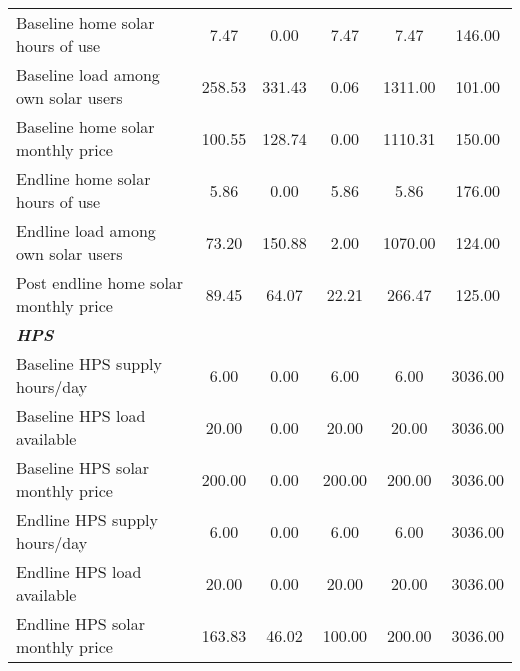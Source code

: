 \begin{table}[htbp]
\begin{tabular}{l*{1}{ccccc}}
Baseline home solar hours of use&        7.47&        0.00&        7.47&        7.47&      146.00\\
Baseline load among own solar users&      258.53&      331.43&        0.06&     1311.00&      101.00\\
Baseline home solar monthly price&      100.55&      128.74&        0.00&     1110.31&      150.00\\
Endline home solar hours of use&        5.86&        0.00&        5.86&        5.86&      176.00\\
Endline load among own solar users&       73.20&      150.88&        2.00&     1070.00&      124.00\\
Post endline home solar monthly price&       89.45&       64.07&       22.21&      266.47&      125.00\\
\textbf{\emph{HPS}} &            &            &            &            &            \\
Baseline HPS supply hours/day&        6.00&        0.00&        6.00&        6.00&     3036.00\\
Baseline HPS load available&       20.00&        0.00&       20.00&       20.00&     3036.00\\
Baseline HPS solar monthly price&      200.00&        0.00&      200.00&      200.00&     3036.00\\
Endline HPS supply hours/day&        6.00&        0.00&        6.00&        6.00&     3036.00\\
Endline HPS load available&       20.00&        0.00&       20.00&       20.00&     3036.00\\
Endline HPS solar monthly price&      163.83&       46.02&      100.00&      200.00&     3036.00\\
\bottomrule
\end{tabular}
\end{table}
